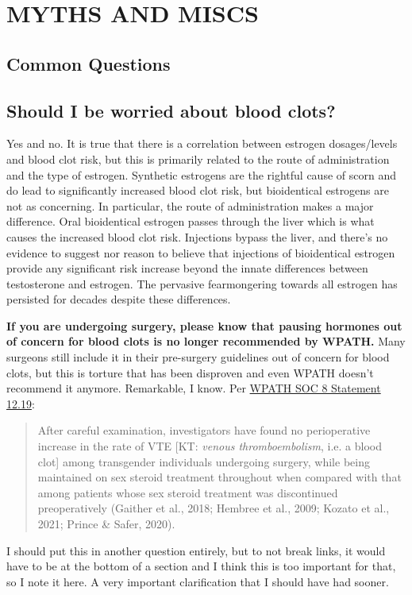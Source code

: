 \documentclass{article}
\begin{document}
 

\section{MYTHS AND MISCS}\label{MM}

\subsection*{Common Questions}

\subsection{Should I be worried about blood clots?}\label{11-1}

Yes and no. It is true that there is a correlation between estrogen dosages/levels and blood clot risk, but this is primarily related to the route of administration and the type of estrogen. Synthetic estrogens are the rightful cause of scorn and do lead to significantly increased blood clot risk, but bioidentical estrogens are not as concerning. In particular, the route of administration makes a major difference. Oral bioidentical estrogen passes through the liver which is what causes the increased blood clot risk. Injections bypass the liver, and there's no evidence to suggest nor reason to believe that injections of bioidentical estrogen provide any significant risk increase beyond the innate differences between testosterone and estrogen. The pervasive fearmongering towards all estrogen has persisted for decades despite these differences.

\textbf{If you are undergoing surgery, please know that pausing hormones out of concern for blood clots is no longer recommended by WPATH.} Many surgeons still include it in their pre-surgery guidelines out of concern for blood clots, but this is torture that has been disproven and even WPATH doesn't recommend it anymore. Remarkable, I know. Per \href{https://www.tandfonline.com/doi/pdf/10.1080/26895269.2022.2100644}{WPATH SOC 8 Statement 12.19}: \blockquote{After careful examination, investigators have found no perioperative increase in the rate of VTE [KT: \textit{venous thromboembolism}, i.e. a blood clot] among transgender individuals undergoing surgery, while being maintained on sex steroid treatment throughout when compared with that among patients whose sex steroid treatment was discontinued preoperatively (Gaither et al., 2018; Hembree et al., 2009; Kozato et al., 2021; Prince \& Safer, 2020).} I should put this in another question entirely, but to not break links, it would have to be at the bottom of a section and I think this is too important for that, so I note it here. A very important clarification that I should have had sooner.
\end{document}
